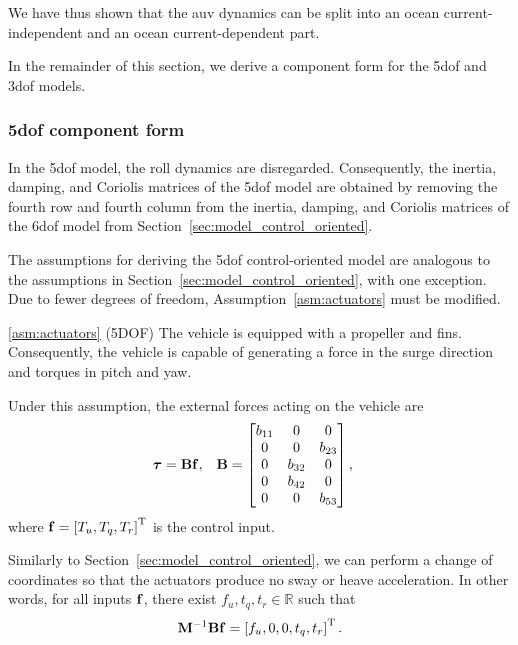 We have thus shown that the \gls{auv} dynamics can be split into an ocean current-independent and an ocean current-dependent part.

In the remainder of this section, we derive a component form for the 5\gls{dof} and 3\gls{dof} models.

\subsubsection{5\gls{dof} component form}
In the 5\gls{dof} model, the roll dynamics are disregarded.
Consequently, the inertia, damping, and Coriolis matrices of the 5\gls{dof} model are obtained by removing the fourth row and fourth column from the inertia, damping, and Coriolis matrices of the 6\gls{dof} model from Section~\ref{sec:model_control_oriented}.

The assumptions for deriving the 5\gls{dof} control-oriented model are analogous to the assumptions in Section~\ref{sec:model_control_oriented}, with one exception.
Due to fewer degrees of freedom, Assumption~\ref{asm:actuators} must be modified.

\begin{customasm}{\ref*{asm:actuators} (5DOF)}
    \label{asm:actuators_5DOF}
    The vehicle is equipped with a propeller and fins.
    Consequently, the vehicle is capable of generating a force in the surge direction and torques in pitch and yaw.
\end{customasm}
Under this assumption, the external forces acting on the vehicle are
\begin{align}
    \bm{\tau} &= \mathbf{B}\mathbf{f}, &
    \mathbf{B} &= 
    \begin{bmatrix}
        b_{11} & 0 & 0 \\ 0 & 0 & b_{23} \\ 0 & b_{32} & 0 \\ 0 & b_{42} & 0 \\ 0 & 0 & b_{53}
    \end{bmatrix},
\end{align}
where $\mathbf{f} = \left[T_u, T_q, T_r\right]^{\mathrm{T}}$ is the control input.

Similarly to Section~\ref{sec:model_control_oriented}, we can perform a change of coordinates so that the actuators produce no sway or heave acceleration.
In other words, for all inputs $\mathbf{f}$, there exist $f_u, t_q, t_r \in \mathbb{R}$ such that
\begin{equation}
    \mathbf{M}^{-1}\mathbf{B}\mathbf{f} = \left[f_u, 0, 0, t_q, t_r\right]^{\mathrm{T}}.
\end{equation}

